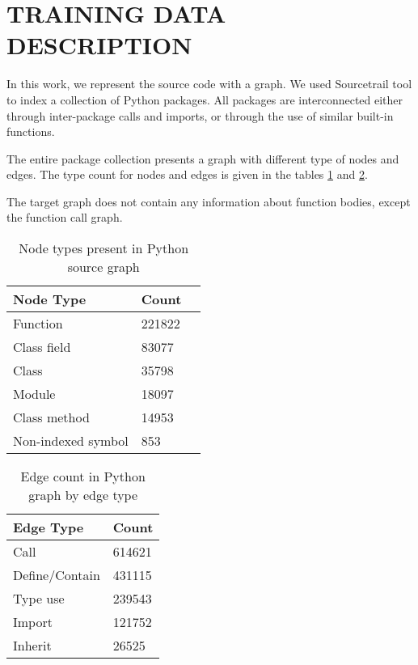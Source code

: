 \documentclass[a4paper,twoside]{article}
\begin{document}
\section{\uppercase{Training Data Description}}

In this work, we represent the source code with a graph. We used Sourcetrail tool to index a collection of Python packages. All packages are interconnected either through inter-package calls and imports, or through the use of similar built-in functions. 

The entire package collection presents a graph with different type of nodes and edges. The type count for nodes and edges is given in the tables \ref{tbl:python_node_count} and \ref{tbl:python_edge_count}. 

The target graph does not contain any information about function bodies, except the function call graph.

\begin{table}[]
\centering
\begin{tabular}{|l|l|l|}
 \hline
Node Type        & Count  \\ \hline
Function        & 221822 \\ \hline
Class field     & 83077 \\ \hline
Class           & 35798 \\ \hline
Module          & 18097 \\ \hline
Class method    & 14953 \\ \hline
Non-indexed symbol  & 853  \\ \hline
\end{tabular}
\caption{Node types present in Python source graph \label{tbl:python_node_count}}
\end{table}

\begin{table}[]
\centering
\begin{tabular}{|l|l|}
\hline
Edge Type       & Count \\ \hline
Call            & 614621 \\ \hline
Define/Contain  & 431115 \\ \hline
Type use        & 239543 \\ \hline
Import          & 121752 \\ \hline
Inherit         & 26525 \\ \hline
\end{tabular}
\caption{Edge count in Python graph by edge type \label{tbl:python_edge_count}}
\end{table}
\end{document}
